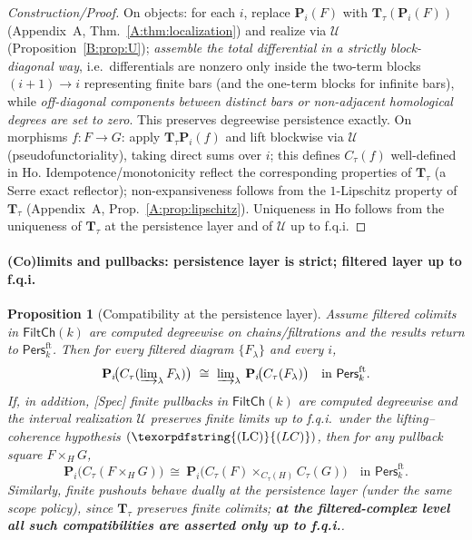 \documentclass[11pt]{article}
\newcommand{\Pers}{\mathsf{Pers}}
\newcommand{\Ho}{\mathrm{Ho}}
\numberwithin{equation}{section}
\newtheorem{proposition}[theorem]{Proposition}
\theoremstyle{definition}
\DeclareRobustCommand{\LC}{\texorpdfstring{\ensuremath{\mathrm{(LC)}}}{(LC)}}
\begin{document}
\begin{proof}[Construction/Proof]
On objects: for each \(i\), replace \(\mathbf{P}_i(F)\) with \(\mathbf{T}_\tau(\mathbf{P}_i(F))\) (Appendix~A, Thm.~\ref{A:thm:localization}) and realize via \(\mathcal{U}\) (Proposition~\ref{B:prop:U}); \emph{assemble the total differential in a strictly block-diagonal way}, i.e.\ differentials are nonzero only inside the two-term blocks \((i+1)\to i\) representing finite bars (and the one-term blocks for infinite bars), while \emph{off-diagonal components between distinct bars or non-adjacent homological degrees are set to zero}. This preserves degreewise persistence exactly.
On morphisms \(f:F\to G\): apply \(\mathbf{T}_\tau\mathbf{P}_i(f)\) and lift blockwise via \(\mathcal{U}\) (pseudofunctoriality), taking direct sums over \(i\); this defines \(C_\tau(f)\) well-defined in \(\Ho\).
Idempotence/monotonicity reflect the corresponding properties of \(\mathbf{T}_\tau\) (a Serre exact reflector); non-expansiveness follows from the \(1\)-Lipschitz property of \(\mathbf{T}_\tau\) (Appendix~A, Prop.~\ref{A:prop:lipschitz}).
Uniqueness in \(\Ho\) follows from the uniqueness of \(\mathbf{T}_\tau\) at the persistence layer and of \(\mathcal{U}\) up to f.q.i.
\end{proof}

\paragraph*{(Co)limits and pullbacks: persistence layer is strict; filtered layer up to f.q.i.}
\begin{proposition}[Compatibility at the persistence layer]\label{B:prop:limits}
Assume filtered colimits in \(\mathsf{FiltCh}(k)\) are computed degreewise on chains/filtrations and the results return to \(\Pers^{\mathrm{ft}}_k\).
Then for every filtered diagram \(\{F_\lambda\}\) and every \(i\),
\[
\mathbf{P}_i\!\big(C_\tau(\varinjlim\nolimits_\lambda F_\lambda)\big)\ \cong\ \varinjlim\nolimits_\lambda\, \mathbf{P}_i\!\big(C_\tau(F_\lambda)\big)\quad\text{in } \Pers^{\mathrm{ft}}_k.
\]
If, in addition, \textup{[Spec]} finite pullbacks in \(\mathsf{FiltCh}(k)\) are computed degreewise and the interval realization \(\mathcal{U}\) preserves finite limits up to f.q.i.\ under the \emph{lifting–coherence} hypothesis \((\LC)\), then for any pullback square \(F\times_H G\),
\[
\mathbf{P}_i\!\big(C_\tau(F\times_H G)\big)\ \cong\ \mathbf{P}_i\!\big(C_\tau(F)\times_{C_\tau(H)} C_\tau(G)\big)\quad\text{in } \Pers^{\mathrm{ft}}_k.
\]
Similarly, finite pushouts behave dually at the persistence layer (under the same scope policy), since \(\mathbf{T}_\tau\) preserves finite colimits; \textbf{at the filtered-complex level all such compatibilities are asserted only \emph{up to f.q.i.}}.
\end{proposition}
\end{document}
